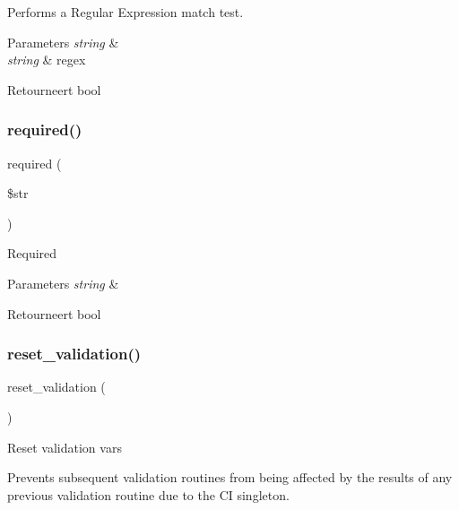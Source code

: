 Performs a Regular Expression match test.


\begin{DoxyParams}{Parameters}
{\em string} & \\
\hline
{\em string} & regex \\
\hline
\end{DoxyParams}
\begin{DoxyReturn}{Retourneert}
bool 
\end{DoxyReturn}
\mbox{\label{class_c_i___form__validation_ada72eadfd041118d5f429a93dd0de07e}} 
\subsubsection{\texorpdfstring{required()}{required()}}
{\footnotesize\ttfamily required (\begin{DoxyParamCaption}\item[{}]{\$str }\end{DoxyParamCaption})}

Required


\begin{DoxyParams}{Parameters}
{\em string} & \\
\hline
\end{DoxyParams}
\begin{DoxyReturn}{Retourneert}
bool 
\end{DoxyReturn}
\mbox{\label{class_c_i___form__validation_a84b8bd64032f6be532968015cba11361}} 
\subsubsection{\texorpdfstring{reset\_validation()}{reset\_validation()}}
{\footnotesize\ttfamily reset\+\_\+validation (\begin{DoxyParamCaption}{ }\end{DoxyParamCaption})}

Reset validation vars

Prevents subsequent validation routines from being affected by the results of any previous validation routine due to the CI singleton.

